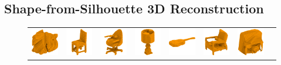 \subsection{Shape-from-Silhouette 3D Reconstruction}

\begin{figure}[t]
\centering
\setlength{\tabcolsep}{0pt}
\begin{tabular}{cccccccc}
\includegraphics[width=.14\linewidth]{dsp/figs/dragon_carve_binary_8_0.png} &
\includegraphics[width=.14\linewidth]{dsp/figs/chair_0013_carve_binary_8_0.png} &
\includegraphics[width=.14\linewidth]{dsp/figs/chair_0200_carve_binary_8_0.png} &
\includegraphics[width=.14\linewidth]{dsp/figs/lamp_0050_carve_binary_8_0.png} &
\includegraphics[width=.14\linewidth]{dsp/figs/guitar_0100_carve_binary_8_0.png} &
\includegraphics[width=.14\linewidth]{dsp/figs/chair_0011_carve_binary_8_0.png} &
\includegraphics[width=.14\linewidth]{dsp/figs/piano_0050_carve_binary_8_0.png} \\


\end{tabular}
\end{figure}
